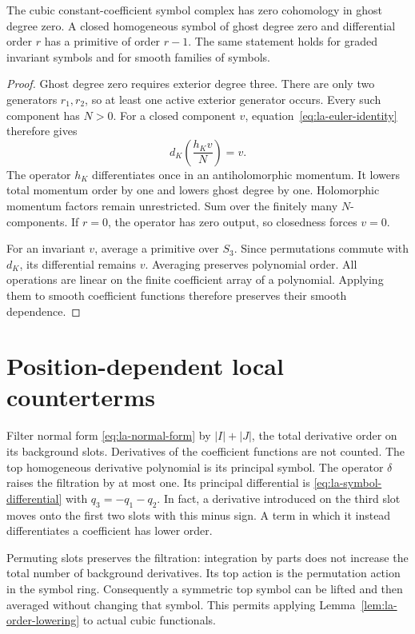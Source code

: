 \begin{lemma}\label{lem:la-order-lowering}
The cubic constant-coefficient symbol complex has zero
cohomology in ghost degree zero. A closed homogeneous symbol
of ghost degree zero and differential order $r$ has a primitive
of order $r-1$. The same statement holds for graded invariant
symbols and for smooth families of symbols.
\end{lemma}
\begin{proof}
Ghost degree zero requires exterior degree three. There are
only two generators $r_1,r_2$, so at least one active exterior
generator occurs. Every such component has $N>0$.
For a closed component $v$, equation~\eqref{eq:la-euler-identity}
therefore gives
\[
 d_K\left(\frac{h_Kv}{N}\right)=v.
\]
The operator $h_K$ differentiates once in an antiholomorphic
momentum. It lowers total momentum order by one and lowers
ghost degree by one. Holomorphic momentum factors remain
unrestricted. Sum over the finitely many $N$-components.
If $r=0$, the operator has zero output, so closedness forces
$v=0$.

For an invariant $v$, average a primitive over $S_3$.
Since permutations commute with $d_K$, its differential remains
$v$. Averaging preserves polynomial order. All operations are
linear on the finite coefficient array of a polynomial.
Applying them to smooth coefficient functions therefore
preserves their smooth dependence.
\end{proof}

\section{Position-dependent local counterterms}
\label{sec:la-smooth-obstruction}

Filter normal form \eqref{eq:la-normal-form} by
$|I|+|J|$, the total derivative order on its background slots.
Derivatives of the coefficient functions are not counted.
The top homogeneous derivative polynomial is its principal
symbol. The operator $\delta$ raises the filtration by at most
one. Its principal differential is
\eqref{eq:la-symbol-differential} with $q_3=-q_1-q_2$.
In fact, a derivative introduced on the third slot moves onto
the first two slots with this minus sign. A term in which it
instead differentiates a coefficient has lower order.

Permuting slots preserves the filtration: integration by parts
does not increase the total number of background derivatives.
Its top action is the permutation action in the symbol ring.
Consequently a symmetric top symbol can be lifted and then
averaged without changing that symbol. This permits applying
Lemma~\ref{lem:la-order-lowering} to actual cubic functionals.

